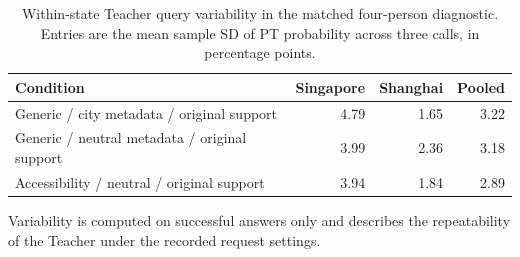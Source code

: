 \begin{table}[pos=htbp]
\centering\footnotesize
\caption{Within-state Teacher query variability in the matched four-person diagnostic. Entries are the mean sample SD of PT probability across three calls, in percentage points.}
\label{tab:teacher_pilot_sd}
\setlength{\tabcolsep}{3pt}
\renewcommand{\arraystretch}{1.15}
\begin{tabular*}{\linewidth}{@{\extracolsep{\fill}}lrrr@{}}
\toprule
Condition & Singapore & Shanghai & Pooled \\
\midrule
Generic / city metadata / original support & 4.79 & 1.65 & 3.22 \\
Generic / neutral metadata / original support & 3.99 & 2.36 & 3.18 \\
Accessibility / neutral / original support & 3.94 & 1.84 & 2.89 \\
\bottomrule
\end{tabular*}
\par\smallskip\begin{minipage}{\linewidth}\footnotesize
Variability is computed on successful answers only and describes the repeatability of the Teacher under the recorded request settings.
\end{minipage}
\end{table}
